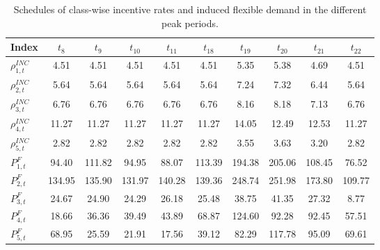 \documentclass[journal]{IEEEtran}
\begin{document}
\begin{table}[bt!]
	\caption{Schedules of class-wise incentive rates and induced flexible demand in the different peak periods.  }
	\label{tab: Optimal incentive price and demand }
	\setlength{\tabcolsep}{1.5pt}
	\renewcommand{\arraystretch}{1.5}
\begin{tabular}{l|ccccccccc}
		\hline
	Index	& $t_8$     & $t_9$     & $t_{10}$    & $t_{11}$    & $t_{18}$    & $t_{19}$    & $t_{20}$    & $t_{21}$    & $t_{22}$    \\ \hline
	$\rho_{1,t}^{INC}$ & 4.51   & 4.51   & 4.51   & 4.51   & 4.51   & 5.35   & 5.38   & 4.69   & 4.51   \\
		$\rho_{2,t}^{INC}$ & 5.64   & 5.64   & 5.64   & 5.64   & 5.64   & 7.24   & 7.32   & 6.44   & 5.64   \\
	$\rho_{3,t}^{INC}$ & 6.76   & 6.76   & 6.76   & 6.76   & 6.76   & 8.16   & 8.18   & 7.13   & 6.76   \\
		$\rho_{4,t}^{INC}$ & 11.27  & 11.27  & 11.27  & 11.27  & 11.27  & 14.05  & 12.49  & 12.53  & 11.27  \\
		$\rho_{5,t}^{INC}$ & 2.82   & 2.82   & 2.82   & 2.82   & 2.82   & 3.55   & 3.63   & 3.20   & 2.82   \\ \hline
	$P_{1,t}^F$	 & 94.40  & 111.82 & 94.95  & 88.07  & 113.39 & 194.38 & 205.06 & 108.45 & 76.52  \\
	$P_{2,t}^F$	 & 134.95 & 135.90 & 131.97 & 140.28 & 139.36 & 248.74 & 251.98 & 173.80 & 109.77 \\
	$P_{3,t}^F$	 & 24.67  & 24.90  & 24.29  & 26.18  & 25.48  & 38.75  & 41.35  & 27.32  & 8.77   \\
	$P_{4,t}^F$ & 18.66  & 36.36  & 39.49  & 43.89  & 68.87  & 124.60 & 92.28  & 92.45  & 57.51  \\
	$P_{5,t}^F$ & 68.95  & 25.59  & 21.91  & 17.56  & 39.12  & 82.29  & 117.78 & 95.09  & 69.61 \\
	 \hline
\end{tabular}
\vspace{-3mm}
\end{table}
\end{document}
